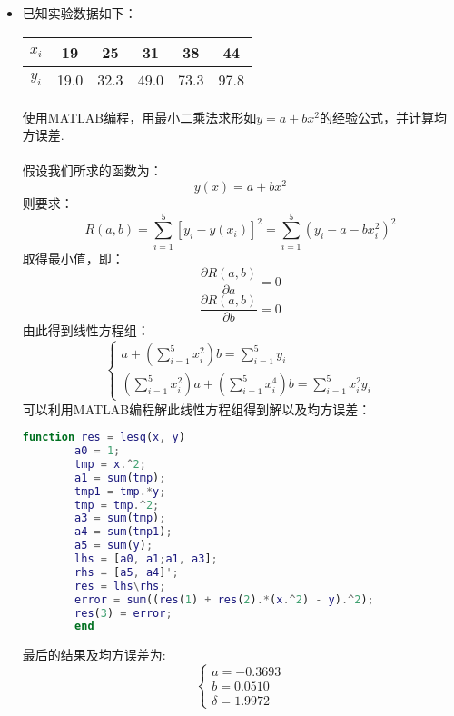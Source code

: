 \documentclass{article}
\begin{document}
\begin{itemize}
$$\begin{array}{lcl}
		0 && j \ne k
		\end{array}
		\right.$$
		则有
		$$\sum_{j = 0}^{n}(\phi_{k}(x), \phi_{j}(x))r_{j} = \int_{0}^{2\pi}f(x)\phi_{k}(x)\,dx$$
		满足最小二次逼近的要求,所以：
		$$f_{*}(x) = \sum_{n = 1}^{n}(a_{k}\cos (kx) + b_{k} \sin (kx))$$
		其中
		$$a_{k} = \frac{1}{\pi}\int_{0}^{2\pi}f(x)cos(kx)dx \quad n= 1, 2 \cdots$$
		$$b_{k} = \frac{1}{\pi}\int_{0}^{2\pi}f(x)sin(kx)dx \quad n= 1, 2 \cdots$$\\\\
		\item[7.]已知实验数据如下：
		\begin{table}[!htbp]
			\centering
			\begin{tabular}{c|ccccc}
				
				\hline
				$x_{i}$ & 19 & 25 & 31 & 38 & 44\\
				\hline
				$y_{i}$ & 19.0 & 32.3 & 49.0 & 73.3 & 97.8\\
				\hline
			\end{tabular}
		\end{table}
	使用MATLAB编程，用最小二乘法求形如$y = a + bx^{2}$的经验公式，并计算均方误差.\\\\
	假设我们所求的函数为：
	$$y(x) = a +bx^2$$
	则要求：
	$$R(a, b) = \sum_{i = 1}^{5}[y_{i} - y(x_{i})]^2 = \sum_{i = 1}^{5}(y_{i} - a - bx_{i}^2)^2$$
	取得最小值，即：
	$$\frac{\partial R(a,b)}{\partial a} = 0$$
	$$\frac{\partial R(a,b)}{\partial b} = 0$$
	由此得到线性方程组：
	$$\left\{
	\begin{array}{lcl}
	a + (\sum\limits_{i = 1}^{5}x_{i}^2)b = \sum\limits_{i = 1}^{5}y_{i}\\
	(\sum\limits_{i = 1}^{5}x_{i}^2)a+(\sum\limits_{i = 1}^{5}x_{i}^4)b = \sum\limits_{i = 1}^{5}x_{i}^2y_{i}
	\end{array}
	\right.$$
	可以利用MATLAB编程解此线性方程组得到解以及均方误差：
	\begin{lstlisting}[language=MATLAB]
		function res = lesq(x, y)
		a0 = 1;
		tmp = x.^2;
		a1 = sum(tmp);
		tmp1 = tmp.*y;
		tmp = tmp.^2;
		a3 = sum(tmp);
		a4 = sum(tmp1);
		a5 = sum(y);
		lhs = [a0, a1;a1, a3];
		rhs = [a5, a4]';
		res = lhs\rhs;
		error = sum((res(1) + res(2).*(x.^2) - y).^2);
		res(3) = error;
		end
	\end{lstlisting}
	最后的结果及均方误差为:
	$$\left\{
	\begin{array}{lcl}
	a = -0.3693\\
	b = 0.0510\\
	\delta = 1.9972
	\end{array}
	\right.$$
	\end{itemize}
\end{document}
